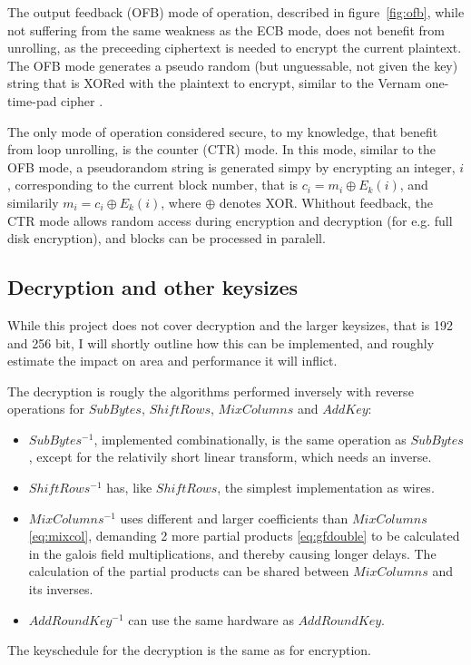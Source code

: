 The output feedback (OFB) mode of
operation, described in figure~\ref{fig:ofb}, while not suffering from
the same weakness as the ECB
mode, does not benefit from unrolling, as the preceeding ciphertext is
needed to encrypt the current plaintext. The OFB mode generates a
pseudo random (but unguessable, not given the key) string that is
XORed with the plaintext to encrypt,
similar to the Vernam one-time-pad cipher \cite{vernam}.

The only mode of operation considered secure, to my knowledge, that
benefit from loop unrolling, is the counter
(CTR) mode. In this mode, similar to the
OFB mode, a pseudorandom string is generated simpy by encrypting an
integer, $i$, corresponding to the current block number, that is $c_i
= m_i \oplus E_k(i)$, and similarily $m_i = c_i \oplus E_k(i)$, where
$\oplus$ denotes XOR. Whithout feedback, the CTR mode allows random
access during encryption and decryption (for e.g. full disk
encryption), and blocks can be processed in paralell.

\subsection{Decryption and other keysizes}

While this project does not cover decryption and the larger keysizes,
that is 192 and 256 bit, I will shortly outline how this can be
implemented, and roughly estimate the impact on area and performance
it will inflict.

The decryption is rougly the algorithms performed inversely with
reverse operations for $SubBytes$, $ShiftRows$, $MixColumns$ and
$AddKey$: 
\begin{itemize}
  \item $SubBytes^{-1}$, implemented combinationally, is the same
    operation as $SubBytes$, except for the relativily short linear
    transform, which needs an inverse. 
  \item $ShiftRows^{-1}$ has, like $ShiftRows$, the simplest
    implementation as wires. 
  \item $MixColumns^{-1}$ uses different and larger coefficients
    than $MixColumns$ \eqref{eq:mixcol}, demanding 2 more partial
    products \eqref{eq:gfdouble} to be calculated in the
    galois field multiplications, and thereby causing longer
    delays. The calculation of the partial products can be shared
    between $MixColumns$ and its inverses. 
  \item $AddRoundKey^{-1}$ can use the same hardware as
    $AddRoundKey$. 
\end{itemize}
The keyschedule for the decryption is the same as for encryption.

